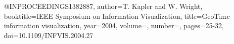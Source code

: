 @INPROCEEDINGS{1382887,
  author={T. {Kapler} and W. {Wright}},
  booktitle={IEEE Symposium on Information Visualization}, 
  title={GeoTime information visualization}, 
  year={2004},
  volume={},
  number={},
  pages={25-32},
  doi={10.1109/INFVIS.2004.27}}
